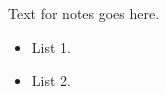 \documentclass[11pt,aspectratio=43,ignorenonframetext,t]{beamer}
\begin{document}
 

\begin{figure}[!ht]  \end{figure}
Text for notes goes here. 
\begin{itemize}
  \item List 1. 
  \item List 2. 
\end{itemize}


\end{document}
